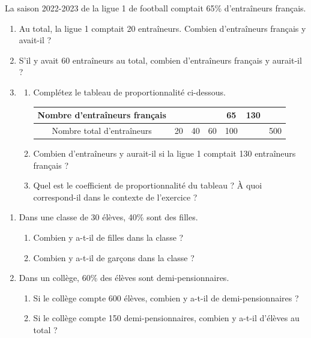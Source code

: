 \documentclass[10pt,a4paper]{article}
\begin{document}
\begin{exo}[][]
La saison 2022-2023 de la ligue 1 de football comptait 65\% d'entraîneurs français.
\begin{enumerate}
    \item Au total, la ligue 1 comptait 20 entraîneurs. Combien d'entraîneurs français y avait-il ?
    \item S'il y avait 60 entraîneurs au total, combien d'entraîneurs français y aurait-il ?
    \item \begin{enumerate}
        \item Complétez le tableau de proportionnalité ci-dessous.
            \begin{center}
            \begin{tabular}{|c|c|c|c|c|c|c|}
            \hline
            Nombre d'entraîneurs français &    &    &    & 65 & 130 &  \\
            \hline
            Nombre total d'entraîneurs    & 20 & 40 & 60 & 100&     & 500  \\
            \hline
            \end{tabular}
            \end{center}
        \item Combien d'entraîneurs y aurait-il si la ligue 1 comptait 130 entraîneurs français  ?
        \item Quel est le coefficient de proportionnalité du tableau ?  À quoi correspond-il dans le contexte de l'exercice ?
    \end{enumerate}
\end{enumerate} 
\end{exo}

\begin{exo}[][]
\begin{enumerate}
    \item Dans une classe de 30 élèves, 40\% sont des filles.
    \begin{enumerate}
        \item Combien y a-t-il de filles dans la classe ?
        \item Combien y a-t-il de garçons dans la classe ?
    \end{enumerate}
    \item Dans un collège, 60\% des élèves sont demi-pensionnaires.
    \begin{enumerate}
        \item Si le collège compte 600 élèves, combien y a-t-il de demi-pensionnaires ?
        \item Si le collège compte 150 demi-pensionnaires, combien y a-t-il d'élèves au total ?
    \end{enumerate}
\end{enumerate}
\end{exo}
\end{document}
